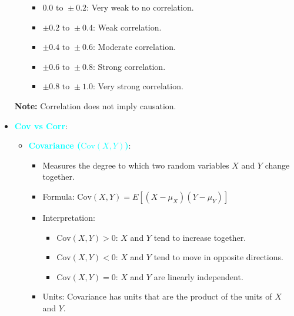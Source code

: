 \documentclass{report}
\begin{document}
\begin{itemize}
\begin{itemize}
                    \begin{itemize}
                        \item \(0.0 \text{ to } \pm 0.2\): Very weak to no correlation.
                        \item \(\pm 0.2 \text{ to } \pm 0.4\): Weak correlation.
                        \item \(\pm 0.4 \text{ to } \pm 0.6\): Moderate correlation.
                        \item \(\pm 0.6 \text{ to } \pm 0.8\): Strong correlation.
                        \item \(\pm 0.8 \text{ to } \pm 1.0\): Very strong correlation.
                    \end{itemize}
            \end{itemize}
            \textbf{Note:} Correlation does not imply causation.
        \item \textbf{\textcolor{cyan}{Cov vs Corr}}:
            \begin{itemize}
                \item \textbf{\textcolor{cyan}{Covariance (\(\text{Cov}(X, Y)\))}}:
                    \begin{itemize}
                        \item Measures the degree to which two random variables \(X\) and \(Y\) change together.
                        \item Formula: \(\text{Cov}(X, Y) = E[(X - \mu_X)(Y - \mu_Y)]\)
                        \item Interpretation:
                            \begin{itemize}
                                \item \(\text{Cov}(X, Y) > 0\): \(X\) and \(Y\) tend to increase together.
                                \item \(\text{Cov}(X, Y) < 0\): \(X\) and \(Y\) tend to move in opposite directions.
                                \item \(\text{Cov}(X, Y) = 0\): \(X\) and \(Y\) are linearly independent.
                            \end{itemize}
                        \item Units: Covariance has units that are the product of the units of \(X\) and \(Y\).
                    \end{itemize}


\end{itemize}
\end{itemize}
\end{document}
